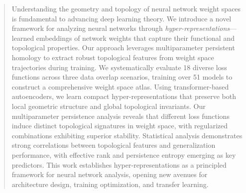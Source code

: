 \begin{abstract}
Understanding the geometry and topology of neural network weight spaces is fundamental to advancing deep learning theory. We introduce a novel framework for analyzing neural networks through \emph{hyper-representations}---learned embeddings of network weights that capture their functional and topological properties. Our approach leverages multiparameter persistent homology to extract robust topological features from weight space trajectories during training. We systematically evaluate 18 diverse loss functions across three data overlap scenarios, training over 51 models to construct a comprehensive weight space atlas. Using transformer-based autoencoders, we learn compact hyper-representations that preserve both local geometric structure and global topological invariants. Our multiparameter persistence analysis reveals that different loss functions induce distinct topological signatures in weight space, with regularized combinations exhibiting superior stability. Statistical analysis demonstrates strong correlations between topological features and generalization performance, with effective rank and persistence entropy emerging as key predictors. This work establishes hyper-representations as a principled framework for neural network analysis, opening new avenues for architecture design, training optimization, and transfer learning.
\end{abstract}